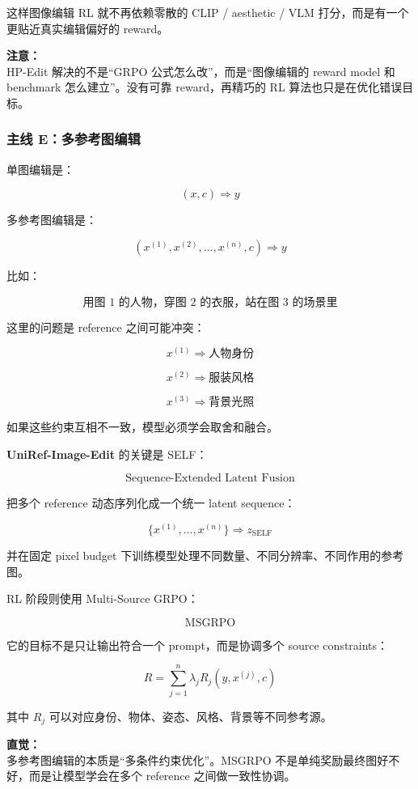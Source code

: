 这样图像编辑 RL 就不再依赖零散的 CLIP / aesthetic / VLM 打分，而是有一个更贴近真实编辑偏好的 reward。

\begin{warnbox}
\textbf{注意：}\\
HP-Edit 解决的不是“GRPO 公式怎么改”，而是“图像编辑的 reward model 和 benchmark 怎么建立”。没有可靠 reward，再精巧的 RL 算法也只是在优化错误目标。
\end{warnbox}

\subsubsection{主线 E：多参考图编辑}

单图编辑是：

\[
(x,c)
\Rightarrow
y
\]

多参考图编辑是：

\[
(x^{(1)},x^{(2)},\ldots,x^{(n)},c)
\Rightarrow
y
\]

比如：

\[
\text{用图 1 的人物，穿图 2 的衣服，站在图 3 的场景里}
\]

这里的问题是 reference 之间可能冲突：

\[
x^{(1)}
\Rightarrow
\text{人物身份}
\]

\[
x^{(2)}
\Rightarrow
\text{服装风格}
\]

\[
x^{(3)}
\Rightarrow
\text{背景光照}
\]

如果这些约束互相不一致，模型必须学会取舍和融合。

\textbf{UniRef-Image-Edit} 的关键是 SELF：

\[
\text{Sequence-Extended Latent Fusion}
\]

把多个 reference 动态序列化成一个统一 latent sequence：

\[
\{x^{(1)},\ldots,x^{(n)}\}
\Rightarrow
z_\text{SELF}
\]

并在固定 pixel budget 下训练模型处理不同数量、不同分辨率、不同作用的参考图。

RL 阶段则使用 Multi-Source GRPO：

\[
\text{MSGRPO}
\]

它的目标不是只让输出符合一个 prompt，而是协调多个 source constraints：

\[
R
=
\sum_{j=1}^{n}
\lambda_j R_j(y,x^{(j)},c)
\]

其中 $R_j$ 可以对应身份、物体、姿态、风格、背景等不同参考源。

\begin{intubox}
\textbf{直觉：}\\
多参考图编辑的本质是“多条件约束优化”。MSGRPO 不是单纯奖励最终图好不好，而是让模型学会在多个 reference 之间做一致性协调。
\end{intubox}

